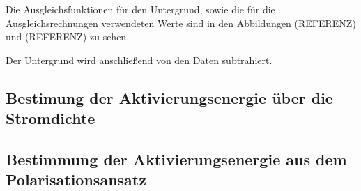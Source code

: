 Die Ausgleichsfunktionen für den Untergrund, sowie die für die Ausgleichsrechnungen
verwendeten Werte sind in den Abbildungen (REFERENZ) und (REFERENZ) zu sehen.


Der Untergrund wird anschließend von den Daten subtrahiert.

\subsection{Bestimung der Aktivierungsenergie über die Stromdichte}

\subsection{Bestimmung der Aktivierungsenergie aus dem Polarisationsansatz}
